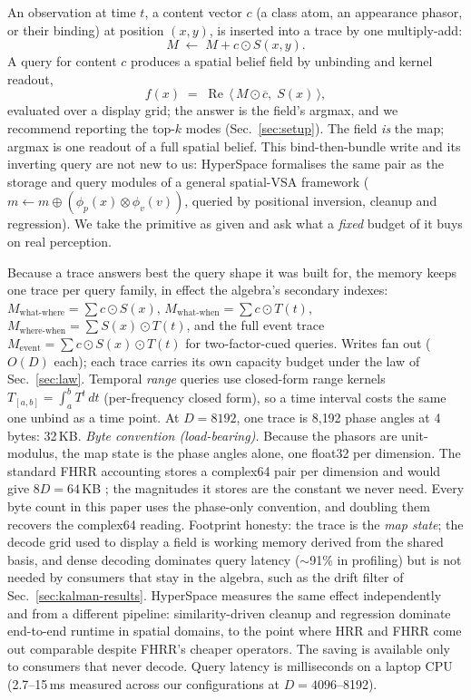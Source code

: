 \documentclass[conference]{IEEEtran}
\newcommand{\bnd}{\odot}
\newcommand{\conj}[1]{\overline{#1}}
\begin{document}
An observation at time $t$, a content vector $c$ (a class atom, an
appearance phasor, or their binding) at position $(x,y)$, is inserted
into a trace by one multiply-add:
\begin{equation}
M \;\leftarrow\; M + c \bnd S(x,y).
\label{eq:insert}
\end{equation}
A query for content $c$ produces a spatial belief field by unbinding and
kernel readout,
\begin{equation}
f(x) \;=\; \operatorname{Re}\,\langle\, M \bnd \conj{c},\; S(x)\,\rangle,
\label{eq:field}
\end{equation}
evaluated over a display grid; the answer is the field's argmax, and we
recommend reporting the top-$k$ modes (Sec.~\ref{sec:setup}). The field
\emph{is} the map; argmax is one readout of a full spatial belief.
This bind-then-bundle write and its inverting query are not new to us:
HyperSpace \cite{snyder2026hyperspace} formalises the same pair as the
storage and query modules of a general spatial-VSA framework
($m \leftarrow m \oplus (\phi_p(x) \otimes \phi_v(v))$, queried by
positional inversion, cleanup and regression). We take the primitive as
given and ask what a \emph{fixed} budget of it buys on real perception.

Because a trace answers best the query shape it was built for, the memory
keeps one trace per query family, in effect the algebra's secondary
indexes:
$M_{\text{what-where}} = \sum c \bnd S(x)$,
$M_{\text{what-when}} = \sum c \bnd T(t)$,
$M_{\text{where-when}} = \sum S(x) \bnd T(t)$, and the full event trace
$M_{\text{event}} = \sum c \bnd S(x) \bnd T(t)$ for two-factor-cued
queries. Writes fan out ($O(D)$ each); each trace carries its own
capacity budget under the law of Sec.~\ref{sec:law}. Temporal
\emph{range} queries use closed-form range kernels
$T_{[a,b]} = \int_a^b T^{t}\,dt$ (per-frequency closed form), so a time
interval costs the same one unbind as a time point. At $D=8192$, one
trace is 8{,}192 phase angles at 4 bytes: 32\,KB. \emph{Byte convention
(load-bearing).} Because the phasors are unit-modulus, the map state is
the phase angles alone, one float32 per dimension. The standard FHRR
accounting stores a complex64 pair per dimension and would give
$8D = 64$\,KB \cite{snyder2026hyperspace}; the magnitudes it stores are
the constant we never need. Every byte count in this paper uses the
phase-only convention, and doubling them recovers the complex64 reading.
Footprint honesty:
the trace is the \emph{map state}; the decode grid used to display a
field is working memory derived from the shared basis, and dense decoding
dominates query latency ($\sim$91\% in profiling) but is not needed by
consumers that stay in the algebra, such as the drift filter of
Sec.~\ref{sec:kalman-results}. HyperSpace
\cite{snyder2026hyperspace} measures the same effect independently and
from a different pipeline: similarity-driven cleanup and regression
dominate end-to-end runtime in spatial domains, to the point where HRR
and FHRR come out comparable despite FHRR's cheaper operators. The
saving is available only to consumers that never decode. Query latency is milliseconds on a laptop
CPU (2.7--15\,ms measured across our configurations at $D=4096$--8192).
\end{document}
